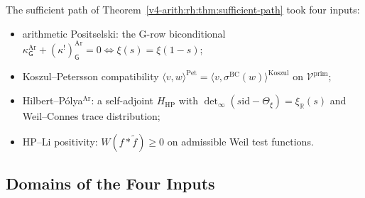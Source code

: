The sufficient path of Theorem~\ref{v4-arith:rh:thm:sufficient-path} took four
inputs:
\begin{itemize}
\item[(P1)] arithmetic Positselski: the G-row biconditional
\(\kappa^{\mathrm{Ar}}_{\mathsf{G}}+(\kappa^{!})^{\mathrm{Ar}}_{\mathsf{G}}=0
\Leftrightarrow \xi(s)=\xi(1-s)\);
\item[(KP)] Koszul--Petersson compatibility
\(\langle v,w\rangle^{\mathrm{Pet}}=\langle v,\sigma^{\mathrm{BC}}(w)\rangle^{\mathrm{Koszul}}\)
on \(\mathcal{V}^{\mathrm{prim}}\);
\item[(HP)] Hilbert--P\'olya\(^{\mathrm{Ar}}\): a self-adjoint
\(H_{\mathrm{HP}}\) with
\(\det_{\infty}(s\mathrm{id}-\Theta_{\xi})=\xi_{\mathbb{R}}(s)\)
and Weil--Connes trace distribution;
\item[(HPLi)] HP--Li positivity:
\(W(f*\widetilde{f})\geq 0\) on admissible Weil test functions.
\end{itemize}

\subsection{Domains of the Four Inputs}
\label{v4-arith:w5-synth:per-input}

